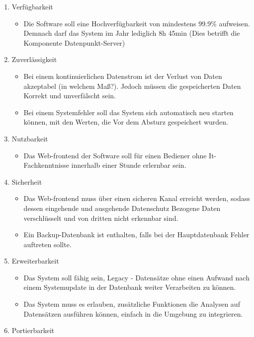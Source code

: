 \begin{enumerate}
    \item Verfügbarkeit
    \begin{itemize}
        \item Die Software soll eine Hochverfügbarkeit von mindestens 99.9\% aufweisen. Demnach darf das System im Jahr lediglich 8h 45min (Dies betrifft die Komponente Datenpunkt-Server)
    \end{itemize}
    \item Zuverlässigkeit
    \begin{itemize}
        \item Bei einem kontinuierlichen Datenstrom ist der Verlust von Daten akzeptabel (in welchem Maß?). Jedoch müssen die gespeicherten Daten Korrekt und unverfälscht sein.
        \item Bei einem Systemfehler soll das System sich automatisch neu starten können, mit den Werten, die Vor dem Absturz gespeichert wurden.
    \end{itemize}
    \item Nutzbarkeit
    \begin{itemize}
        \item Das Web-frontend der Software soll für einen Bediener ohne It-Fachkenntnisse innerhalb einer Stunde erlernbar sein. 
    \end{itemize}
    \item Sicherheit
    \begin{itemize}
        \item Das Web-frontend muss über einen sicheren Kanal erreicht werden, sodass dessen eingehende und ausgehende Datenschutz Bezogene Daten verschlüsselt und von dritten nicht erkennbar sind. 
        \item Ein Backup-Datenbank ist enthalten, falls bei der Hauptdatenbank Fehler auftreten sollte.
    \end{itemize}
    \item Erweiterbarkeit
    \begin{itemize}
        \item Das System soll fähig sein, Legacy - Datensätze ohne einen Aufwand nach einem Systemupdate in der Datenbank weiter Verarbeiten zu können.
        \item Das System muss es erlauben, zusätzliche Funktionen die Analysen auf Datensätzen ausführen können, einfach in die Umgebung zu integrieren.  
    \end{itemize}
    \item Portierbarkeit

\end{enumerate}
